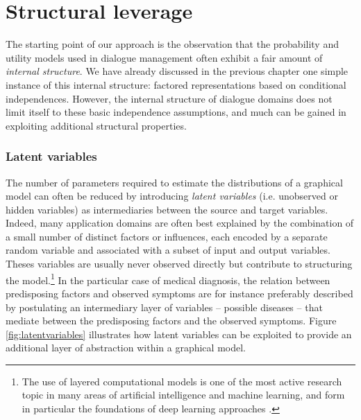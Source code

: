 \section{Structural leverage}
\label{sec:rmotivation}

The starting point of our approach is the observation that the probability and utility models used in dialogue management often exhibit a fair amount of \textit{internal structure}.  
We have already discussed in the previous chapter one simple instance of this internal structure: factored representations based on conditional independences. However, the internal structure of dialogue domains does not limit itself to these basic independence assumptions, and much can be gained in exploiting additional structural properties. 



\subsubsection*{Latent variables}
 
The number of parameters required to estimate the distributions of a graphical model can often be reduced by introducing \textit{latent variables} (i.e. unobserved or hidden variables) as intermediaries between the source and target variables. Indeed, many application domains are often best explained by the combination of a small number of distinct factors or influences, each encoded by a separate random variable and associated with a subset of input and output variables. Theses variables are usually never observed directly but contribute to structuring the model.\footnote{The use of layered computational models is one of the most active research topic in many areas of artificial intelligence and machine learning, and form in particular the foundations of deep learning approaches \citep{Bengio:2009}.} In the particular case of medical diagnosis, the relation between predisposing factors and observed symptoms are for instance preferably described by postulating an intermediary layer of variables -- possible diseases -- that mediate between the predisposing factors and the observed symptoms.  Figure \ref{fig:latentvariables} illustrates how latent variables can be exploited to provide an additional layer of abstraction within a graphical model.

